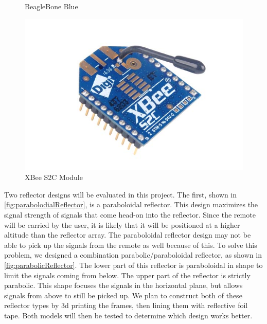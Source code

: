 \documentclass[letterpaper,12pt]{article}   %
\begin{document}
\begin{figure}
\begin{minipage}[t]{0.32\textwidth}
    \captionsetup{width=\textwidth}
    \caption{BeagleBone Blue}
    \label{fig:beagleboneBlue}
  \end{minipage}
  \begin{minipage}[t]{0.32\textwidth}
    \includegraphics[width=1\textwidth]{figs/img/Xbee-S2C-Module}
    \captionsetup{width=\textwidth}
    \caption{XBee S2C Module}
    \label{fig:XBeeModule}
  \end{minipage}
\end{figure}

\vspace*{12pt}
\noindent
Two reflector designs will be evaluated in this project. The first, shown in \autoref{fig:parabolodialReflector}, is a paraboloidal reflector. This design maximizes the signal strength of signals that come head-on into the reflector. Since the remote will be carried by the user, it is likely that it will be positioned at a higher altitude than the reflector array. The paraboloidal reflector design may not be able to pick up the signals from the remote as well because of this. To solve this problem, we designed a combination parabolic/paraboloidal reflector, as shown in \autoref{fig:parabolicReflector}. The lower part of this reflector is paraboloidal in shape to limit the signals coming from below. The upper part of the reflector is strictly parabolic. This shape focuses the signals in the horizontal plane, but allows signals from above to still be picked up. We plan to construct both of these reflector types by 3d printing the frames, then lining them with reflective foil tape. Both models will then be tested to determine which design works better.
\end{document}
